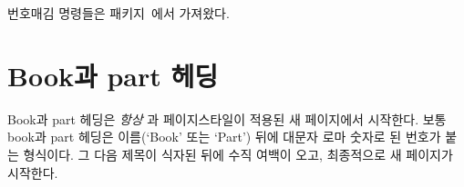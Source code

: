 번호매김 명령들은  패키지~\cite{TOCVSEC2}에서 가져왔다.

\section{Book과 part 헤딩}


Book과 part 헤딩은 \emph{항상} 과  페이지스타일이
적용된 새 페이지에서 시작한다. 보통 book과 part 헤딩은 이름(`Book' 또는 `Part')
뒤에 대문자 로마 숫자로 된 번호가 붙는 형식이다. 그 다음 제목이 식자된 뒤에 수직
여백이 오고, 최종적으로 새 페이지가 시작한다.

